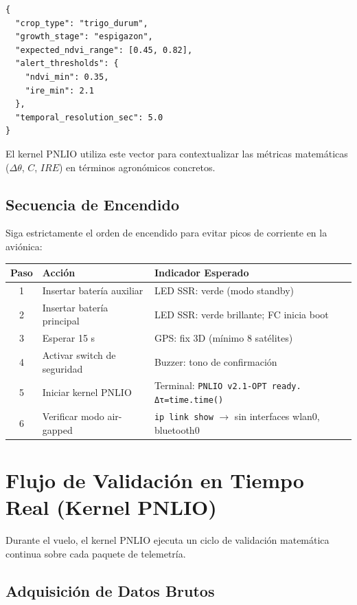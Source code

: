 \begin{verbatim}
{
  "crop_type": "trigo_durum",
  "growth_stage": "espigazon",
  "expected_ndvi_range": [0.45, 0.82],
  "alert_thresholds": {
    "ndvi_min": 0.35,
    "ire_min": 2.1
  },
  "temporal_resolution_sec": 5.0
}
\end{verbatim}

El kernel PNLIO utiliza este vector para contextualizar las métricas matemáticas ($\Delta\theta$, $C$, $IRE$) en términos agronómicos concretos.

\subsection{Secuencia de Encendido}

Siga estrictamente el orden de encendido para evitar picos de corriente en la aviónica:

\begin{table}[h]
\centering
\begin{tabular}{|c|l|l|}
\hline
\textbf{Paso} & \textbf{Acción} & \textbf{Indicador Esperado} \\ \hline
1 & Insertar batería auxiliar & LED SSR: verde (modo standby) \\ \hline
2 & Insertar batería principal & LED SSR: verde brillante; FC inicia boot \\ \hline
3 & Esperar 15 s & GPS: fix 3D (mínimo 8 satélites) \\ \hline
4 & Activar switch de seguridad & Buzzer: tono de confirmación \\ \hline
5 & Iniciar kernel PNLIO & Terminal: \texttt{PNLIO v2.1-OPT ready. Δτ=time.time()} \\ \hline
6 & Verificar modo air-gapped & \texttt{ip link show} $\rightarrow$ sin interfaces wlan0, bluetooth0 \\ \hline
\end{tabular}
\end{table}

\section{Flujo de Validación en Tiempo Real (Kernel PNLIO)}

Durante el vuelo, el kernel PNLIO ejecuta un ciclo de validación matemática continua sobre cada paquete de telemetría.

\subsection{Adquisición de Datos Brutos}

